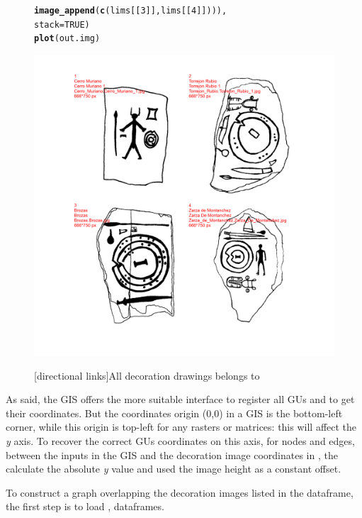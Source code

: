 \documentclass[article]{jss}\usepackage[]{graphicx}\usepackage[]{color}
\makeatletter
\def\maxwidth{ %
  \ifdim\Gin@nat@width>\linewidth
    \linewidth
  \else
    \Gin@nat@width
  \fi
}
\newcommand{\hlnum}[1]{\textcolor[rgb]{0.686,0.059,0.569}{#1}}%
\newcommand{\hlstd}[1]{\textcolor[rgb]{0.345,0.345,0.345}{#1}}%
\newcommand{\hlkwc}[1]{\textcolor[rgb]{0.333,0.667,0.333}{#1}}%
\newcommand{\hlkwd}[1]{\textcolor[rgb]{0.737,0.353,0.396}{\textbf{#1}}}%
\newenvironment{kframe}{%
 \def\at@end@of@kframe{}%
 \ifinner\ifhmode%
  \def\at@end@of@kframe{\end{minipage}}%
  \begin{minipage}{\columnwidth}%
 \fi\fi%
 \def\FrameCommand##1{\hskip\@totalleftmargin \hskip-\fboxsep
 \colorbox{shadecolor}{##1}\hskip-\fboxsep
     \hskip-\linewidth \hskip-\@totalleftmargin \hskip\columnwidth}%
 \MakeFramed {\advance\hsize-\width
   \@totalleftmargin\z@ \linewidth\hsize
   \@setminipage}}%
 {\par\unskip\endMakeFramed%
 \at@end@of@kframe}
\newenvironment{knitrout}{}{} %
\makeatother
\begin{document}
\begin{figure}[H]
\begin{knitrout}
\begin{kframe}
\begin{alltt}
                          \hlkwd{image_append}\hlstd{(}\hlkwd{c}\hlstd{(lims[[}\hlnum{3}\hlstd{]],lims[[}\hlnum{4}\hlstd{]]))),}
                        \hlkwc{stack} \hlstd{=} \hlnum{TRUE}\hlstd{)}
\hlkwd{plot}\hlstd{(out.img)}
\end{alltt}
\end{kframe}
\includegraphics[width=\maxwidth]{figure/unnamed-chunk-4-1} 

\end{knitrout}
[directional links]{All decoration drawings belongs to \citep{DiazGuardamino10}}
\end{figure}

As said, the GIS offers the more suitable interface to register all GUs and to get their coordinates. But the coordinates origin (0,0) in a GIS is the bottom-left corner, while this origin is top-left for any  rasters or matrices: this will affect the \emph{y} axis. To recover the correct GUs coordinates on this axis, for nodes and edges, between the inputs in the GIS and the decoration image coordinates in , the  calculate the absolute \emph{y} value and used the image height as a constant offset. 

To construct a graph overlapping the decoration images listed in the  dataframe, the first step is to load ,  dataframes.
\end{document}
